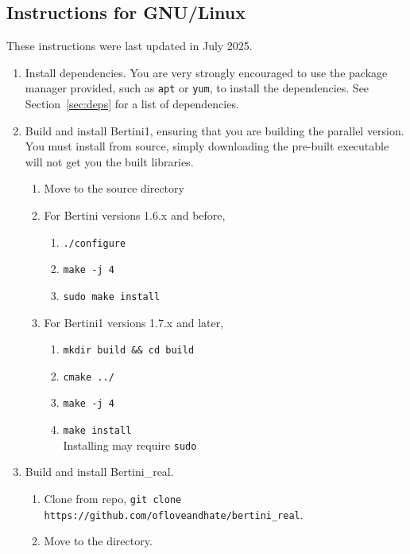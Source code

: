 
\subsection{Instructions for GNU/Linux}
\label{sec:install_linux}


These instructions were last updated in July 2025.


\begin{enumerate}
\item Install dependencies. You are very strongly encouraged to use the package manager provided, such as {\tt apt} or {\tt yum}, to install the dependencies.  See Section~\ref{sec:deps} for a list of dependencies.
\item Build and install Bertini1, ensuring that you are building the parallel version.  You must install from source, simply downloading the pre-built executable will not get you the built libraries.

\begin{enumerate}
	\item Move to the source directory
	\item For Bertini versions 1.6.x and before,
	\begin{enumerate}
		\item {\tt ./configure}
		\item {\tt make -j 4}
		\item {\tt sudo make install}
	\end{enumerate}
	\item For Bertini1 versions 1.7.x and later, 
      \begin{enumerate}
        \item \verb|mkdir build && cd build|
        \item \verb|cmake ../|
        \item \verb|make -j 4|
        \item \verb|make install| \\ Installing may require \verb|sudo|
      \end{enumerate}

\end{enumerate}
\item Build and install Bertini\_real.  
\begin{enumerate}
	\item Clone from repo, {\tt git clone https://github.com/ofloveandhate/bertini\_real}.  

	\item Move to the directory.


\end{enumerate}
\end{enumerate}
